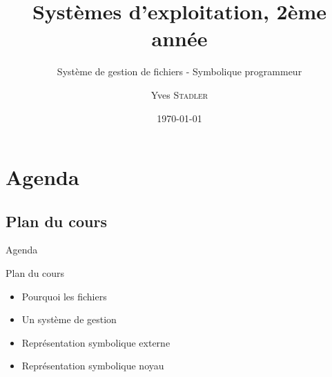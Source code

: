 
\title{Systèmes d'exploitation, 2ème année}
\subtitle{Système de gestion de fichiers - Symbolique programmeur}

\author{Yves \textsc{Stadler}}

\date{\today}




\begin{frame}
\titlepage
\end{frame}

\def\sectitle{Agenda}
\section{\sectitle}
\def\subsectitle{Plan du cours}
\subsection{\subsectitle}

\begin{frame}{\sectitle}
\begin{block}{\subsectitle}
\begin{itemize}
\item Pourquoi les fichiers 
\item Un système de gestion
\item Représentation symbolique externe
\item Représentation symbolique noyau
\end{itemize}
\end{block}
\end{frame}


\def\sectitle{Objectifs et motivations}
